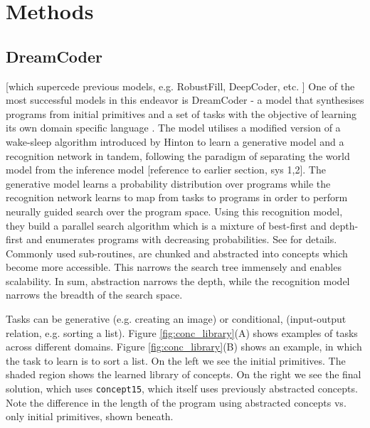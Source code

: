 \section{Methods}

\subsection{DreamCoder}
[which supercede previous models, e.g. RobustFill, DeepCoder, etc. ]
One of the most successful models in this endeavor is DreamCoder - a model that synthesises programs from initial primitives and a set of tasks with the objective of learning its own domain specific language \cite{ellis_dreamcoder_2021}. The model utilises a modified version of a wake-sleep algorithm introduced by Hinton to learn a generative model and a recognition network in tandem, following the paradigm of separating the world model from the inference model \cite{hinton1995wake} [reference to earlier section, sys 1,2]. The generative model learns a probability distribution over programs while the recognition network learns to map from tasks to programs in order to perform neurally guided search over the program space. Using this recognition model, they build a parallel search algorithm which is a mixture of best-first and depth-first and enumerates programs with decreasing probabilities. See \cite{Ellis_Wong_Nye_Sable-Meyer_Cary_Morales_Hewitt_Solar-Lezama_Tenenbaum} for details.
Commonly used sub-routines, are chunked and abstracted into concepts which become more accessible. This narrows the search tree immensely and enables scalability. In sum, abstraction narrows the depth, while the recognition model narrows the breadth of the search space.

Tasks can be generative (e.g. creating an image) or conditional, (input-output relation, e.g. sorting a list).
Figure \ref{fig:conc_library}(A) shows examples of tasks across different domains. 
Figure \ref{fig:conc_library}(B) shows an example, in which the task to learn is to sort a list. On the left we see the initial primitives. The shaded region shows the learned library of concepts. On the right we see the final solution, which uses \texttt{concept15}, which itself uses previously abstracted concepts. Note the difference in the length of the program using abstracted concepts vs. only initial primitives, shown beneath.

